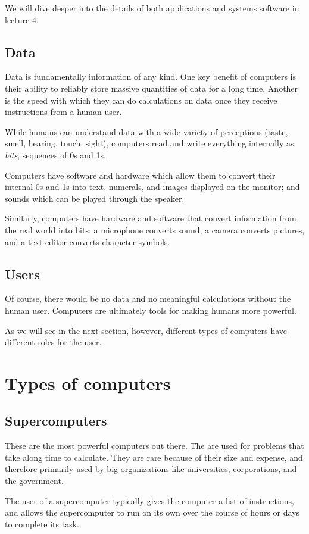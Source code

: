 We will dive deeper into the details of both applications and systems software in lecture 4.

\subsection{Data}
Data is fundamentally information of any kind. One key benefit of computers is their ability to reliably store massive quantities of data for a long time. Another is the speed with which they can do calculations on data once they receive instructions from a human user.

While humans can understand data with a wide variety of perceptions (taste,
smell, hearing, touch, sight), computers read and write everything internally as
\textit{bits}, sequences of 0s and 1s.

Computers have software and hardware which allow them to convert their internal 0s and 1s into text, numerals, and images displayed on the monitor; and sounds which can be played through the speaker.

Similarly, computers have hardware and software that convert information from
the real world into bits: a microphone converts sound, a camera converts pictures, and a text editor converts character symbols.

\subsection{Users}
Of course, there would be no data and no meaningful calculations without the human user. Computers are ultimately tools for making humans more powerful.

As we will see in the next section, however, different types of computers have different roles for the user.


\section{Types of computers}

\subsection{Supercomputers}
These are the most powerful computers out there. The are used for problems that take along time to calculate. They are rare because of their size and expense, and therefore primarily used by big organizations like universities, corporations, and the government.

The user of a supercomputer typically gives the computer a list of instructions, and allows the supercomputer to run on its own over the course of hours or days to complete its task.

